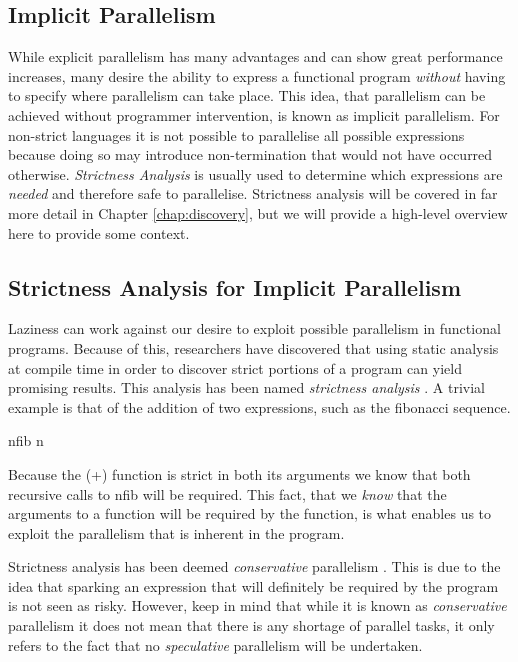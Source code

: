 \subsection{Implicit Parallelism}

While explicit parallelism has many advantages and can show great performance
increases, many desire the ability to express a functional program
\emph{without} having to specify where parallelism can take place. This idea,
that parallelism can be achieved without programmer intervention, is known as
implicit parallelism. For non-strict languages it is not possible to
parallelise all possible expressions because doing so may introduce
non-termination that would not have occurred otherwise. \emph{Strictness
Analysis} is usually used to determine which expressions are \emph{needed} and
therefore safe to parallelise.  Strictness analysis will be covered in far more
detail in Chapter \ref{chap:discovery}, but we will provide a high-level
overview here to provide some context.  

\subsection*{Strictness Analysis for Implicit Parallelism}

Laziness can work against our desire to exploit possible parallelism in
functional programs. Because of this, researchers have discovered that using
static analysis at compile time in order to discover strict portions of a
program can yield promising results. This analysis has been named
\emph{strictness analysis} \citep{ritabook, SPJ:PIFPL}. A trivial example is
that of the addition of two expressions, such as the fibonacci sequence.

\begin{haskell}
nfib n 
\end{haskell}

Because the \<(+)\> function is strict in both its arguments we know that
both recursive calls to \<nfib\> will be required. This fact, that we
\emph{know} that the arguments to a function will be required by the function,
is what enables us to exploit the parallelism that is inherent in the program.

Strictness analysis has been deemed \emph{conservative} parallelism
\citep{SPJ:PIFPL}. This is due to the idea that sparking an expression that
will definitely be required by the program is not seen as risky. However, keep
in mind that while it is known as \emph{conservative} parallelism it does not
mean that there is any shortage of parallel tasks, it only refers to the fact
that no \emph{speculative} parallelism will be undertaken.

